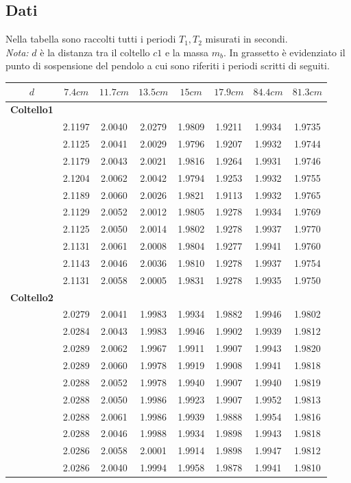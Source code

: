 \subsection{Dati}
Nella tabella sono raccolti tutti i periodi $T_1,T_2$ misurati in secondi. \\
\textit{Nota:} $d$ è la distanza tra il coltello $c1$ e la massa $m_b$. 
In grassetto è evidenziato il punto di sospensione del pendolo a cui sono riferiti i periodi scritti di seguiti. 
\begin{center}
\begin{tabular}{*{8}{c}}
$d$& $7.4cm$ & $11.7cm$ & $13.5cm$  & $15cm$ & $17.9cm$ & $84.4cm$ & $81.3cm$ \\
\midrule
 \textbf{Coltello1}&& & & & & \\
&2.1197 &2.0040&2.0279 &1.9809 & 1.9211 & 1.9934 & 1.9735\\
 &2.1125&2.0041 &2.0029&1.9796 & 1.9207 & 1.9932 & 1.9744 \\
 &2.1179&2.0043 &2.0021&1.9816 & 1.9264 & 1.9931 & 1.9746 \\
 &2.1204&2.0062 &2.0042&1.9794 & 1.9253 & 1.9932 & 1.9755 \\
 &2.1189&2.0060 &2.0026&1.9821 & 1.9113 & 1.9932 & 1.9765 \\
 &2.1129&2.0052&2.0012&1.9805 & 1.9278 & 1.9934 & 1.9769 \\
&2.1125 &2.0050&2.0014&1.9802 & 1.9278 & 1.9937 & 1.9770 \\
&2.1131 &2.0061&2.0008&1.9804 & 1.9277 & 1.9941 & 1.9760 \\
 &2.1143&2.0046&2.0036&1.9810 & 1.9278 & 1.9937 & 1.9754 \\
 &2.1131&2.0058&2.0005& 1.9831 & 1.9278 & 1.9935 & 1.9750 \\
\textbf{Coltello2} && & & & & \\
&2.0279&2.0041&1.9983 &1.9934 & 1.9882 & 1.9946 &	1.9802 \\
&2.0284&2.0043&1.9983 &1.9946 & 1.9902 & 1.9939 &	1.9812 \\
&2.0289&2.0062&1.9967 &1.9911 & 1.9907 & 1.9943 &	1.9820 \\
&2.0289&2.0060&1.9978 &1.9919 & 1.9908 & 1.9941 &	1.9818 \\
&2.0288&2.0052&1.9978 &1.9940 & 1.9907 & 1.9940 &	1.9819 \\
&2.0288&2.0050&1.9986 &1.9923 & 1.9907 & 1.9952 &	1.9813 \\
&2.0288&2.0061&1.9986 &1.9939 & 1.9888 & 1.9954 &	1.9816 \\
&2.0288&2.0046&1.9988&1.9934 & 1.9898 & 1.9943 &	1.9818 \\
&2.0286&2.0058&2.0001 &1.9914 & 1.9898 & 1.9947 &	1.9812  \\
&2.0286&2.0040&1.9994 &1.9958 & 1.9878 & 1.9941 &	1.9810 \\
\bottomrule
\end{tabular}
\end{center}

